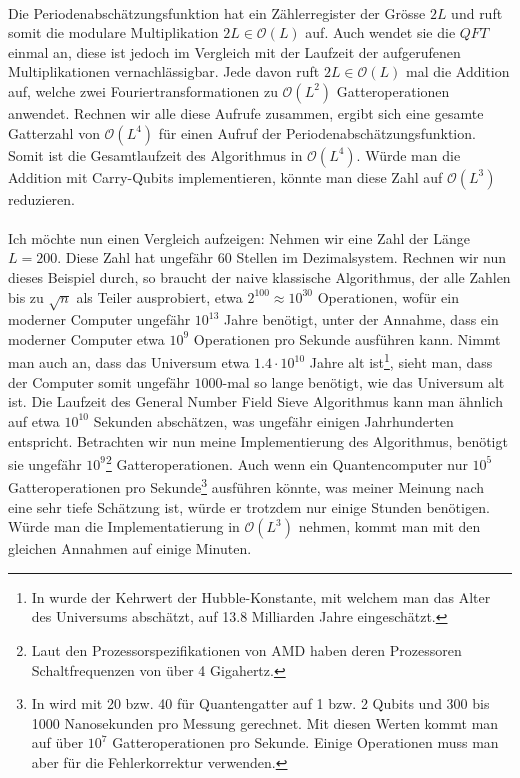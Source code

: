 \paragraph{}
Die Periodenabschätzungsfunktion hat ein Zählerregister der Grösse $2L$ und ruft somit die modulare Multiplikation $2L \in \mathcal O(L)$ auf. Auch wendet sie die $QFT$ einmal an, diese ist jedoch im Vergleich mit der Laufzeit der aufgerufenen Multiplikationen vernachlässigbar. Jede davon ruft $2L \in \mathcal O(L)$ mal die Addition auf, welche zwei Fouriertransformationen zu $\mathcal O(L^2)$ Gatteroperationen anwendet. Rechnen wir alle diese Aufrufe zusammen, ergibt sich eine gesamte Gatterzahl von $\mathcal O(L^4)$ für einen Aufruf der Periodenabschätzungsfunktion. Somit ist die Gesamtlaufzeit des Algorithmus in $\mathcal O(L^4)$. Würde man die Addition mit Carry-Qubits implementieren, könnte man diese Zahl auf $\mathcal O(L^3)$ reduzieren.

\paragraph{}

Ich möchte nun einen Vergleich aufzeigen: Nehmen wir eine Zahl der Länge $L = 200$. Diese Zahl hat ungefähr $60$ Stellen im Dezimalsystem. Rechnen wir nun dieses Beispiel durch, so braucht der naive klassische Algorithmus, der alle Zahlen bis zu $\sqrt{n}$ als Teiler ausprobiert, etwa $2^{100} \approx 10^{30}$ Operationen, wofür ein moderner Computer ungefähr $10^{13}$ Jahre benötigt, unter der Annahme, dass ein moderner Computer etwa $10^9$ Operationen pro Sekunde ausführen kann. Nimmt man auch an, dass das Universum etwa $1.4 \cdot 10^{10}$ Jahre alt ist\footnote{In \cite{ageu} wurde der Kehrwert der Hubble-Konstante, mit welchem man das Alter des Universums abschätzt, auf 13.8 Milliarden Jahre eingeschätzt.}, sieht man, dass der Computer somit ungefähr $1000$-mal so lange benötigt, wie das Universum alt ist. Die Laufzeit des General Number Field Sieve Algorithmus kann man ähnlich auf etwa $10^{10}$ Sekunden abschätzen, was ungefähr einigen Jahrhunderten entspricht. Betrachten wir nun meine Implementierung des Algorithmus, benötigt sie ungefähr $10^9$\footnote{Laut den Prozessorspezifikationen von AMD \cite{amdpr} haben deren Prozessoren Schaltfrequenzen von über 4 Gigahertz.} Gatteroperationen. Auch wenn ein Quantencomputer nur $10^5$ Gatteroperationen pro Sekunde\footnote{In \cite{eqasm} wird mit 20 bzw. 40 für Quantengatter auf 1 bzw. 2 Qubits und 300 bis 1000 Nanosekunden pro Messung gerechnet. Mit diesen Werten kommt man auf über $10^7$ Gatteroperationen pro Sekunde. Einige Operationen muss man aber für die Fehlerkorrektur verwenden.} ausführen könnte, was meiner Meinung nach eine sehr tiefe Schätzung ist, würde er trotzdem nur einige Stunden benötigen. Würde man die Implementatierung in $\mathcal O(L^3)$ nehmen, kommt man mit den gleichen Annahmen auf einige Minuten.